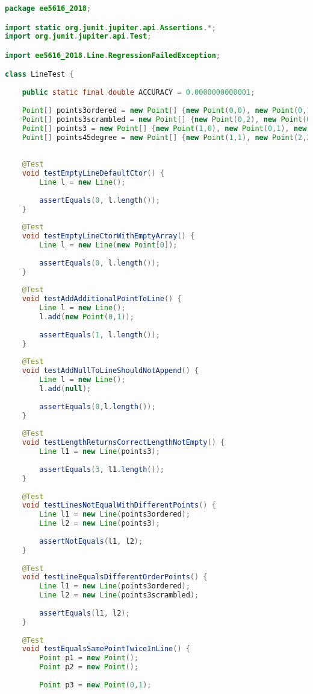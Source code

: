 \begin{lstlisting}[language=java,
    label=lst:linetest,
    caption=JUnit Tests for Line
]
package ee5616_2018;

import static org.junit.jupiter.api.Assertions.*;
import org.junit.jupiter.api.Test;

import ee5616_2018.Line.RegressionFailedException;

class LineTest {
	
	public static final double ACCURACY = 0.0000000000001;
	
	Point[] points3ordered = new Point[] {new Point(0,0), new Point(0,1), new Point(0,2)};
	Point[] points3scrambled = new Point[] {new Point(0,2), new Point(0,0), new Point(0,1)};
	Point[] points3 = new Point[] {new Point(1,0), new Point(0,1), new Point(1,2)};
	Point[] points45degree = new Point[] {new Point(1,1), new Point(2,2), new Point(3,3)};
	
	
	@Test
	void testEmptyLineDefaultCtor() {
		Line l = new Line();
		
		assertEquals(0, l.length());
	}
	
	@Test
	void testEmptyLineCtorWithEmptyArray() {
		Line l = new Line(new Point[0]);
		
		assertEquals(0, l.length());
	}
	
	@Test
	void testAddAdditionalPointToLine() {
		Line l = new Line();
		l.add(new Point(0,1));
		
		assertEquals(1, l.length());
	}
	
	@Test
	void testAddNullToLineShouldNotAppend() {
		Line l = new Line();
		l.add(null);
		
		assertEquals(0,l.length());
	}
	
	@Test
	void testLengthReturnsCorrectLengthNotEmpty() {
		Line l1 = new Line(points3);
		
		assertEquals(3, l1.length());
	}
	
	@Test
	void testLinesNotEqualWithDifferentPoints() {
		Line l1 = new Line(points3ordered);
		Line l2 = new Line(points3);
		
		assertNotEquals(l1, l2);
	}
	
	@Test
	void testLineEqualsDifferentOrderPoints() {
		Line l1 = new Line(points3ordered);
		Line l2 = new Line(points3scrambled);
		
		assertEquals(l1, l2);
	}
	
	@Test
	void testEqualsSamePointTwiceInLine() {
		Point p1 = new Point();
		Point p2 = new Point();
		
		Point p3 = new Point(0,1);
		

\end{lstlisting}
